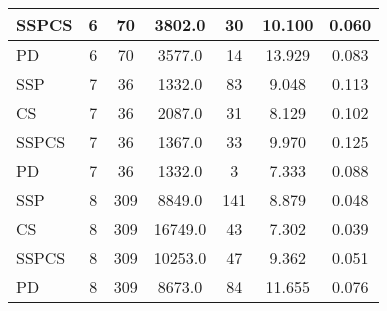 \documentclass{article}
\begin{document}
\begin{table}[H]
{\begin{tabular}{|l|c|c|c|c|c|c|}
SSPCS              & 6              & 70                & 3802.0                 & 30             & 10.100                   & 0.060                                  \\ \hline
PD                 & 6              & 70                & 3577.0                 & 14             & 13.929                   & 0.083                                  \\ \hline
\hhline{|=======|}
SSP                & 7              & 36                & 1332.0                 & 83             & 9.048                    & 0.113                                  \\ \hline
CS                 & 7              & 36                & 2087.0                 & 31             & 8.129                    & 0.102                                  \\ \hline
SSPCS              & 7              & 36                & 1367.0                 & 33             & 9.970                    & 0.125                                  \\ \hline
PD                 & 7              & 36                & 1332.0                 & 3              & 7.333                    & 0.088                                  \\ \hline
\hhline{|=======|}
SSP                & 8              & 309               & 8849.0                 & 141            & 8.879                    & 0.048                                  \\ \hline
CS                 & 8              & 309               & 16749.0                & 43             & 7.302                    & 0.039                                  \\ \hline
SSPCS              & 8              & 309               & 10253.0                & 47             & 9.362                    & 0.051                                  \\ \hline
PD                 & 8              & 309               & 8673.0                 & 84             & 11.655                   & 0.076                                  \\ \hline
\end{tabular}%
}
\label{tab:simulation1_algorithm_metrics}
\end{table}
\end{document}
